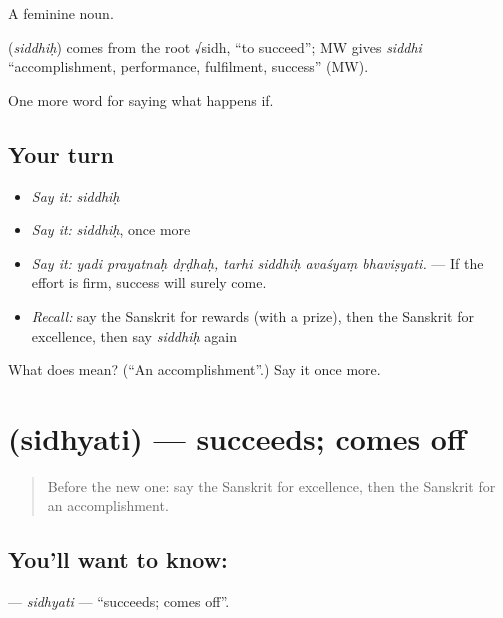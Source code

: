 A feminine noun.

\begin{cousinweb}
\textbf{} (\emph{siddhiḥ}) comes from the root √sidh, \textquotedblleft{}to succeed\textquotedblright{}; MW gives \emph{siddhi} \textquotedblleft{}accomplishment, performance, fulfilment, success\textquotedblright{} (MW).
\end{cousinweb}

\begin{grammarlens}[title={What you've built}]
One more word for saying what happens if.
\end{grammarlens}

\subsection*{Your turn}
\begin{itemize}
\raggedright
  \item \emph{Say it:} \emph{siddhiḥ}
  \item \emph{Say it:} \emph{siddhiḥ}, once more
  \item \emph{Say it:} \emph{yadi prayatnaḥ dṛḍhaḥ, tarhi siddhiḥ avaśyaṃ bhaviṣyati.} — If the effort is firm, success will surely come.
  \item \emph{Recall:} say the Sanskrit for rewards (with a prize), then the Sanskrit for excellence, then say \emph{siddhiḥ} again
\end{itemize}

\begin{tcolorbox}[breakable,colback=teal!4,colframe=teal!35!black,title={Before you move on}]
What does  mean? (\textquotedblleft{}An accomplishment\textquotedblright{}.) Say it once more.
\end{tcolorbox}
\section[\texorpdfstring{\sk{सिध्यति} (sidhyati)}{सिध्यति (sidhyati)}]{ (sidhyati) — succeeds; comes off}

\label{lesson:SA-C386-sidhyati}



\begin{quote}
Before the new one: say the Sanskrit for excellence, then the Sanskrit for an accomplishment.
\end{quote}

\subsection*{You'll want to know: }
\textbf{} — \emph{sidhyati} — \textquotedblleft{}succeeds; comes off\textquotedblright{}.

